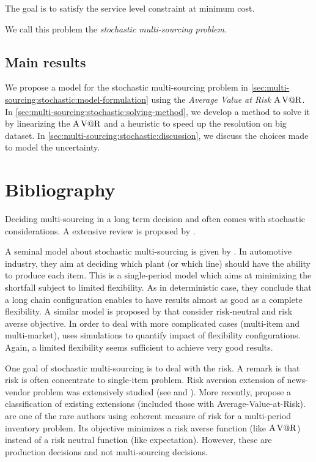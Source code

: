 The goal is to satisfy the service level constraint at minimum cost.


We call this problem the \emph{stochastic multi-sourcing problem}.


\subsection{Main results}
\label{sec:multi-sourcing:stochastic:introduction:main-results}


We propose a model for the stochastic multi-sourcing problem in \cref{sec:multi-sourcing:stochastic:model-formulation} using the \emph{Average Value at Risk $\operatorname{A\operatorname{V@R}}$}.
In \cref{sec:multi-sourcing:stochastic:solving-method}, we develop a method to solve it by linearizing the $\operatorname{A\operatorname{V@R}}$ and a heuristic to speed up the resolution on big dataset.
In \cref{sec:multi-sourcing:stochastic:discussion}, we discuss the choices made to model the uncertainty.



\section{Bibliography}
\label{sec:multi-sourcing:stochastic:bibliography}


Deciding multi-sourcing in a long term decision and often comes with stochastic considerations.
A extensive review is proposed by \citet{Yao2017}.


A seminal model about stochastic multi-sourcing is given by \citet{Jordan1995}.
In automotive industry, they aim at deciding which plant (or which line) should have the ability to produce each item.
This is a single-period model which aims at minimizing the shortfall subject to limited flexibility.
As in deterministic case, they conclude that a long chain configuration enables to have results almost as good as a complete flexibility.
A similar model is proposed by \citet{Brian2005} that consider risk-neutral and risk averse objective.
In order to deal with more complicated cases (multi-item and multi-market), \citet{Garavelli2003} uses simulations to quantify impact of flexibility configurations.
Again, a limited flexibility seems sufficient to achieve very good results.


One goal of stochastic multi-sourcing is to deal with the risk.
A remark is that risk is often concentrate to single-item problem.
Risk aversion extension of news-vendor problem was extensively studied (see \citet{Vipul2000} and \citet{Choi2008}).
More recently, \citet{Arikan2017} propose a classification of existing extensions (included those with Average-Value-at-Risk).
\citet{Ahmed2007} are one of the rare authors using coherent measure of risk for a multi-period inventory problem.
Its objective minimizes a risk averse function (like $\operatorname{A\operatorname{V@R}}$) instead of a risk neutral function (like expectation).
However, these are production decisions and not multi-sourcing decisions.


